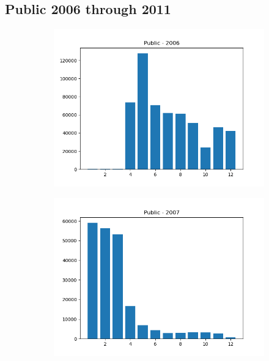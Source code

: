 \documentclass{article}
\begin{document}
\subsection*{Public 2006 through 2011}
\begin{figure}[H]
    \begin{subfigure}{.5\textwidth}
        \centering
        \includegraphics[width=\textwidth]{../../output/figures/annual_source_distribution/Public_data_dist_2006.png}
    \end{subfigure}
    \begin{subfigure}{.5\textwidth}
        \centering
        \includegraphics[width=\textwidth]{../../output/figures/annual_source_distribution/Public_data_dist_2007.png}

\end{subfigure}
\end{figure}
\end{document}
